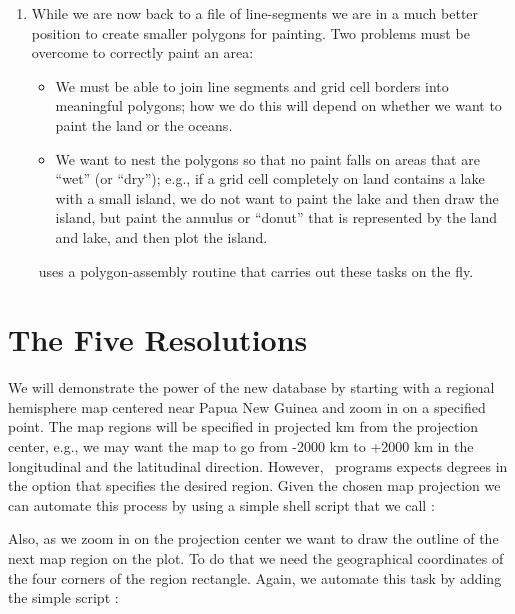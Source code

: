 \begin{enumerate}
\item While we are now back to a file of line-segments we are in
a much better position to create smaller polygons for painting.
Two problems must be overcome to correctly paint an area:

\begin{itemize}

\item We must be able to join line segments and grid cell borders
into meaningful polygons; how we do this will depend on whether
we want to paint the land or the oceans.

\item We want to nest the polygons so that no paint falls on areas
that are ``wet'' (or ``dry''); e.g., if a grid cell completely on
land contains a lake with a small island, we do not want to paint
the lake and then draw the island, but paint the annulus or ``donut''
that is represented by the land and lake, and then plot the island.

\end{itemize}

\GMT\ uses a polygon-assembly routine that carries out these
tasks on the fly.

\end{enumerate} 

\section{The Five Resolutions} 

We will demonstrate the power of the new database by starting with
a regional hemisphere map centered near Papua New Guinea and zoom
in on a specified point.  The map regions will be specified in
projected km from the projection center, e.g., we may want the
map to go from \mbox{-2000} km to \mbox{+2000} km in the longitudinal
and the latitudinal direction.
However, \GMT\ programs expects degrees in the  option that
specifies the desired region.  Given the chosen map projection we
can automate this process by using a simple shell script that we
call :


Also, as we zoom in on the projection center we want to draw the
outline of the next map region on the plot.  To do that we need
the geographical coordinates of the four corners of the region
rectangle.  Again, we automate this task by adding the simple
script :

